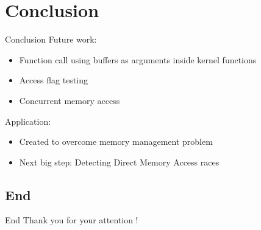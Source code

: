 \documentclass{beamer}
\begin{document}
\section{Conclusion}
\begin{frame}{Conclusion}
Future work:
\begin{itemize}
\item Function call using buffers as arguments inside kernel functions
\item Access flag testing
\item Concurrent memory access
\end{itemize}

Application:
\begin{itemize}
\item Created to overcome memory management problem
\item Next big step: Detecting Direct Memory Access races
\end{itemize}
\end{frame}

\subsection{End}
\begin{frame}{End}
\center
Thank you for your attention !
\end{frame}
\end{document}
